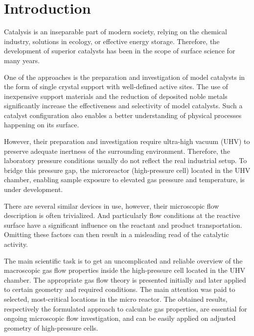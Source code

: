\section*{Introduction}
	Catalysis is an inseparable part of modern society, relying on the chemical industry, solutions in ecology, or effective energy storage.
	Therefore, the development of superior catalysts has been in the scope of surface science for many years. 

	One of the approaches is the preparation and investigation of model catalysts in the form of single crystal support with well-defined active sites.
	The use of inexpensive support materials and the reduction of deposited noble metals significantly increase the effectiveness and selectivity of model catalysts.
	Such a catalyst configuration also enables a better understanding of physical processes happening on its surface. 

	However, their preparation and investigation require ultra-high vacuum (UHV) to preserve adequate inertness of the surrounding environment.
	Therefore, the laboratory pressure conditions usually do not reflect the real industrial setup. To bridge this pressure gap, the microreactor (high-pressure cell) located in the UHV chamber, enabling sample exposure to elevated gas pressure and temperature, is under development. 

	There are several similar devices in use, however, their microscopic flow description is often trivialized.
	And particularly flow conditions at the reactive surface have a significant influence on the reactant and product transportation.
	Omitting these factors can then result in a misleading read of the catalytic activity. 

	The main scientific task is to get an uncomplicated and reliable overview of the macroscopic gas flow properties inside the high-pressure cell located in the UHV chamber.
	The appropriate gas flow theory is presented initially and later applied to certain geometry and required conditions.
	The main attention was paid to selected, most-critical locations in the micro reactor.
	The obtained results, respectively the formulated approach to calculate gas properties, are essential for ongoing microscopic flow investigation, and can be easily applied on adjusted geometry of high-pressure cells. 
